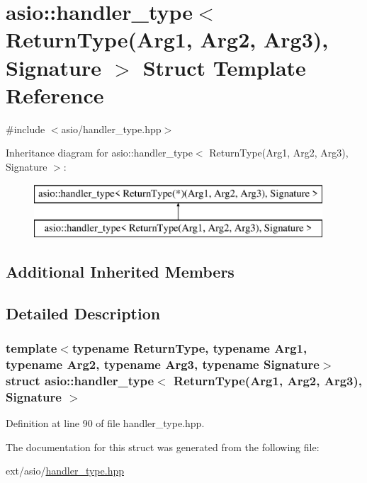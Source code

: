 \hypertarget{structasio_1_1handler__type_3_01_return_type_07_arg1_00_01_arg2_00_01_arg3_08_00_01_signature_01_4}{}\section{asio\+:\+:handler\+\_\+type$<$ Return\+Type(Arg1, Arg2, Arg3), Signature $>$ Struct Template Reference}
\label{structasio_1_1handler__type_3_01_return_type_07_arg1_00_01_arg2_00_01_arg3_08_00_01_signature_01_4}


{\ttfamily \#include $<$asio/handler\+\_\+type.\+hpp$>$}

Inheritance diagram for asio\+:\+:handler\+\_\+type$<$ Return\+Type(Arg1, Arg2, Arg3), Signature $>$\+:\begin{figure}[H]
\begin{center}
\leavevmode
\includegraphics[height=2.000000cm]{structasio_1_1handler__type_3_01_return_type_07_arg1_00_01_arg2_00_01_arg3_08_00_01_signature_01_4}
\end{center}
\end{figure}
\subsection*{Additional Inherited Members}


\subsection{Detailed Description}
\subsubsection*{template$<$typename Return\+Type, typename Arg1, typename Arg2, typename Arg3, typename Signature$>$struct asio\+::handler\+\_\+type$<$ Return\+Type(\+Arg1, Arg2, Arg3), Signature $>$}



Definition at line 90 of file handler\+\_\+type.\+hpp.



The documentation for this struct was generated from the following file\+:\begin{DoxyCompactItemize}
\item 
ext/asio/\hyperlink{handler__type_8hpp}{handler\+\_\+type.\+hpp}\end{DoxyCompactItemize}
